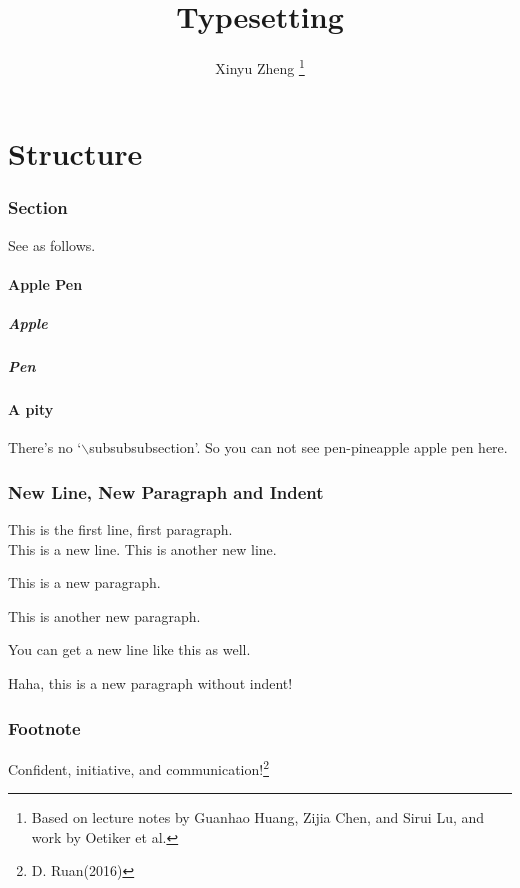 \documentclass[12pt]{article}
\author{Xinyu Zheng \thanks{Based on lecture notes by Guanhao Huang, Zijia Chen, and Sirui Lu, and work by Oetiker et{} al.}}
\title{Typesetting}
\begin{document}
\maketitle
\newpage

\tableofcontents
\newpage

\part{Structure}

\section{Section}
See as follows.
\subsection{Apple Pen}
\subsubsection{Apple}
\subsubsection{Pen}
\subsection*{A pity}
There's no `$\backslash$subsubsubsection'. So you can not see pen-pineapple apple pen here.

\section{New Line, New Paragraph and Indent}
This is the first line, first paragraph.\\
This is a new line.\newline
\indent This is another new line.

This is a new paragraph.\par
This is another new paragraph.

You can get a new line like this as well.

\noindent Haha, this is a new paragraph without indent!

\section{Footnote}
Confident, initiative, and communication!\footnote{D. Ruan(2016)}
\end{document}
